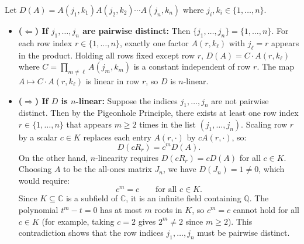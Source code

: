 \begin{exercisesolution}
\label{sol:monomial_matrix_multilinear}
Let $D(A) = A(j_1, k_1) A(j_2, k_2) \cdots A(j_n, k_n)$ where $j_i, k_i \in \{1, \dots, n\}$.

\begin{itemize}
    \item \textbf{($\Leftarrow$) If $j_1, \dots, j_n$ are pairwise distinct:}
    Then $\{j_1, \dots, j_n\} = \{1, \dots, n\}$. For each row index $r \in \{1, \dots, n\}$, exactly one factor $A(r, k_{\ell})$ with $j_{\ell} = r$ appears in the product.
    Holding all rows fixed except row $r$, $D(A) = C \cdot A(r, k_{\ell})$ where $C = \prod_{m \ne \ell} A(j_m, k_m)$ is a constant independent of row $r$.
    The map $A \mapsto C \cdot A(r, k_{\ell})$ is linear in row $r$, so $D$ is $n$-linear.

    \item \textbf{($\Rightarrow$) If $D$ is $n$-linear:}
    Suppose the indices $j_1, \dots, j_n$ are not pairwise distinct.
    Then by the Pigeonhole Principle, there exists at least one row index $r \in \{1, \dots, n\}$ that appears $m \ge 2$ times in the list $(j_1, \dots, j_n)$.
    Scaling row $r$ by a scalar $c \in K$ replaces each entry $A(r, \cdot)$ by $c A(r, \cdot)$, so:
    \[
    D(c R_r) = c^m D(A).
    \]
    On the other hand, $n$-linearity requires $D(c R_r) = c D(A)$ for all $c \in K$.
    Choosing $A$ to be the all-ones matrix $J_n$, we have $D(J_n) = 1 \ne 0$, which would require:
    \[
    c^m = c \qquad \text{for all } c \in K.
    \]
    Since $K \subseteq \mathbb{C}$ is a subfield of $\mathbb{C}$, it is an infinite field containing $\mathbb{Q}$.
    The polynomial $t^m - t = 0$ has at most $m$ roots in $K$, so $c^m = c$ cannot hold for all $c \in K$ (for example, taking $c = 2$ gives $2^m \ne 2$ since $m \ge 2$).
    This contradiction shows that the row indices $j_1, \dots, j_n$ must be pairwise distinct. \qedhere
\end{itemize}
\end{exercisesolution}


